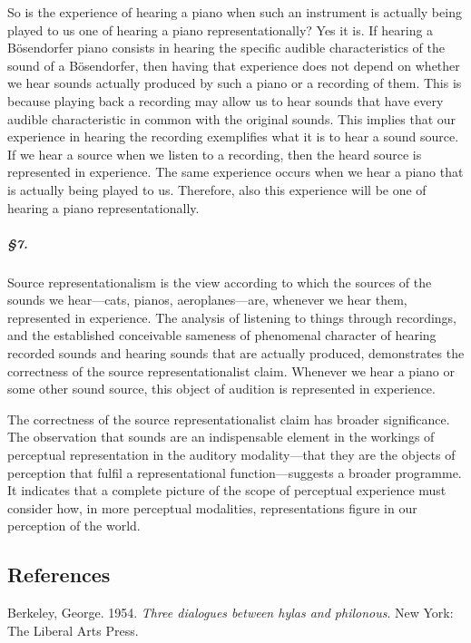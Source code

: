 \documentclass[sloppy, journal, git, anonymise]{humapap}
\begin{document}
So is the experience of hearing a piano when such an instrument is
actually being played to us one of hearing a piano representationally?
Yes it is. If hearing a Bösendorfer piano consists in hearing the
specific audible characteristics of the sound of a Bösendorfer, then
having that experience does not depend on whether we hear sounds
actually produced by such a piano or a recording of them. This is
because playing back a recording may allow us to hear sounds that have
every audible characteristic in common with the original sounds. This
implies that our experience in hearing the recording exemplifies what it
is to hear a sound source. If we hear a source when we listen to a
recording, then the heard source is represented in experience. The same
experience occurs when we hear a piano that is actually being played to
us. Therefore, also this experience will be one of hearing a piano
representationally.

\subparagraph{§7.}\label{section-6}

Source representationalism is the view according to which the sources of
the sounds we hear---cats, pianos, aeroplanes---are, whenever we hear
them, represented in experience. The analysis of listening to things
through recordings, and the established conceivable sameness of
phenomenal character of hearing recorded sounds and hearing sounds that
are actually produced, demonstrates the correctness of the source
representationalist claim. Whenever we hear a piano or some other sound
source, this object of audition is represented in experience.

The correctness of the source representationalist claim has broader
significance. The observation that sounds are an indispensable element
in the workings of perceptual representation in the auditory
modality---that they are the objects of perception that fulfil a
representational function---suggests a broader programme. It indicates
that a complete picture of the scope of perceptual experience must
consider how, in more perceptual modalities, representations figure in
our perception of the world.

\subsection*{References}

\setlength{\parindent}{-0.2in} \setlength{\leftskip}{0.2in}
\setlength{\parskip}{8pt} \vspace*{-0.2in} \noindent

Berkeley, George. 1954. \emph{Three dialogues between hylas and
philonous}. New York: The Liberal Arts Press.
\end{document}
